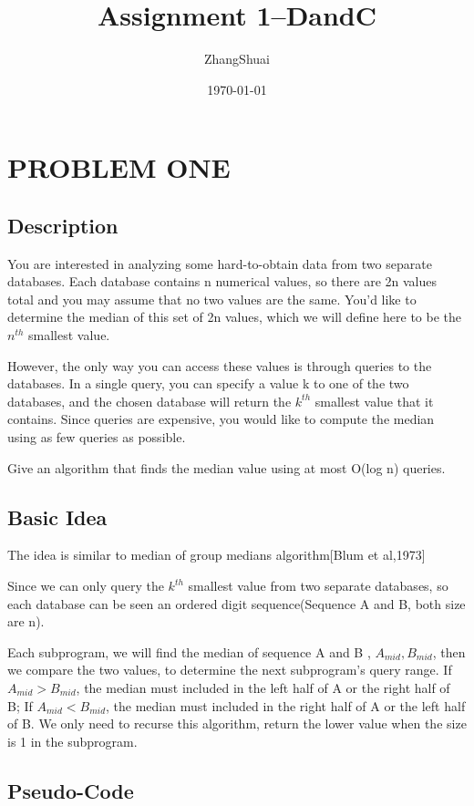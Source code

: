 \documentclass[UTF8,a4paper,12pt]{article}
\title{Assignment 1--DandC}
\author{ZhangShuai}
\date{\today}
\begin{document}
	
	\newpage
	\section{PROBLEM ONE}
	\subsection{Description}
		You are interested in analyzing some hard-to-obtain data from two separate databases. Each database contains n numerical values, so there are 2n values total and you may assume that no two values are the same. You’d like to determine the median of this set of 2n values, which we will define here to be the $ n^{th} $ smallest value.
		
		However, the only way you can access these values is through queries to the databases. In a single query, you can specify a value k to one of the two databases, and the chosen database will return the $k^{th}$ smallest value that it contains. Since queries are expensive, you would like to compute the median using as few queries as possible.
		
		Give an algorithm that finds the median value using at most O(log n) queries.
	
	\subsection{Basic Idea}
		The idea is similar to median of group medians algorithm[Blum et al,1973]
		
		Since we can only query the $ k^{th} $ smallest value from two separate databases, so each database can be seen an ordered digit sequence(Sequence A and B, both size are n).
		
		Each subprogram, we will find the median of sequence A and B , $ A_{mid},B_{mid} $, then we compare the two values, to determine the next subprogram's query range. If $ A_{mid} > B_{mid} $, the median must included in the left half of A or the right half of B; If $ A_{mid} < B_{mid} $, the median must included in the right half of A or the left half of B. We only need to recurse this algorithm, return the lower value when the size is 1 in the subprogram.   
	
	\subsection{Pseudo-Code}
	
\end{document}
